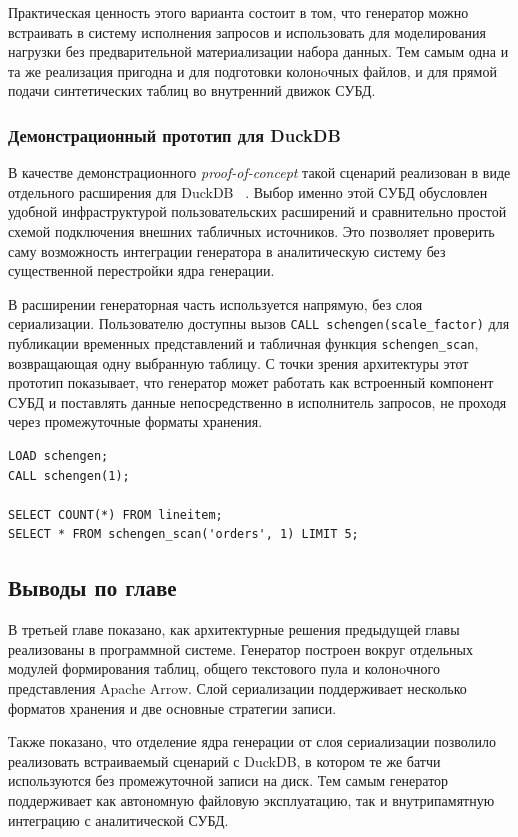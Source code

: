 Практическая ценность этого варианта состоит в том, что генератор можно
встраивать в систему исполнения запросов и использовать для моделирования
нагрузки без предварительной материализации набора данных. Тем самым одна и та
же реализация пригодна и для подготовки колонoчных файлов, и для прямой
подачи синтетических таблиц во внутренний движок СУБД.

\subsubsection{Демонстрационный прототип для DuckDB}

В качестве демонстрационного \textit{proof-of-concept} такой сценарий
реализован в виде отдельного расширения для DuckDB
~\cite{schengen-duckdb-repo,duckdb-extensions}. Выбор именно этой СУБД
обусловлен удобной инфраструктурой пользовательских расширений и сравнительно
простой схемой подключения внешних табличных источников. Это позволяет
проверить саму возможность интеграции генератора в аналитическую систему без
существенной перестройки ядра генерации.

В расширении генераторная часть используется напрямую, без слоя сериализации.
Пользователю доступны вызов \texttt{CALL schengen(scale\_factor)} для
публикации временных представлений и табличная функция
\texttt{schengen\_scan}, возвращающая одну выбранную таблицу. С точки зрения
архитектуры этот прототип показывает, что генератор может работать как
встроенный компонент СУБД и поставлять данные непосредственно в исполнитель
запросов, не проходя через промежуточные форматы хранения.

\begin{lstlisting}[style=reportlisting,caption={Использование встроенного сценария через DuckDB},label={lst:chapter3-duckdb}]
LOAD schengen;
CALL schengen(1);

SELECT COUNT(*) FROM lineitem;
SELECT * FROM schengen_scan('orders', 1) LIMIT 5;
\end{lstlisting}

\subsection*{Выводы по главе}

В третьей главе показано, как архитектурные решения предыдущей главы
реализованы в программной системе. Генератор построен вокруг отдельных
модулей формирования таблиц, общего текстового пула и колонoчного
представления Apache Arrow. Слой сериализации поддерживает несколько
форматов хранения и две основные стратегии записи.

Также показано, что отделение ядра генерации от слоя сериализации позволило
реализовать встраиваемый сценарий с DuckDB, в котором те же батчи
используются без промежуточной записи на диск. Тем самым генератор
поддерживает как автономную файловую эксплуатацию, так и внутрипамятную
интеграцию с аналитической СУБД.
